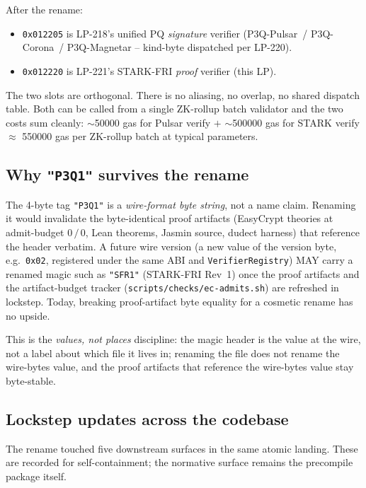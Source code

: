 After the rename:

\begin{itemize}[leftmargin=2em,nosep]
\item \texttt{0x012205} is LP-218's unified PQ \emph{signature}
  verifier (P3Q-Pulsar~/ P3Q-Corona~/ P3Q-Magnetar -- kind-byte
  dispatched per LP-220).
\item \texttt{0x012220} is LP-221's STARK-FRI \emph{proof}
  verifier (this LP).
\end{itemize}

The two slots are orthogonal. There is no aliasing, no overlap, no
shared dispatch table. Both can be called from a single ZK-rollup
batch validator and the two costs sum cleanly:
$\sim$\num{50000} gas for Pulsar verify $+$ $\sim$\num{500000}
gas for STARK verify $\approx$ \num{550000} gas per ZK-rollup
batch at typical parameters.

\subsection{Why \texttt{"P3Q1"} survives the rename}

The 4-byte tag \texttt{"P3Q1"} is a \emph{wire-format byte string},
not a name claim. Renaming it would invalidate the byte-identical
proof artifacts (EasyCrypt theories at admit-budget $0\,/\,0$, Lean
theorems, Jasmin source, dudect harness) that reference the header
verbatim. A future wire version (a new value of the version byte,
e.g.\ \texttt{0x02}, registered under the same ABI and
\texttt{VerifierRegistry}) MAY carry a renamed magic such as
\texttt{"SFR1"} (STARK-FRI Rev~1) once the proof artifacts and the
artifact-budget tracker (\texttt{scripts/checks/ec-admits.sh}) are
refreshed in lockstep. Today, breaking proof-artifact byte equality
for a cosmetic rename has no upside.

This is the \emph{values, not places} discipline: the magic header
is the value at the wire, not a label about which file it lives in;
renaming the file does not rename the wire-bytes value, and the
proof artifacts that reference the wire-bytes value stay byte-stable.

\subsection{Lockstep updates across the codebase}

The rename touched five downstream surfaces in the same atomic
landing. These are recorded for self-containment; the normative
surface remains the precompile package itself.

